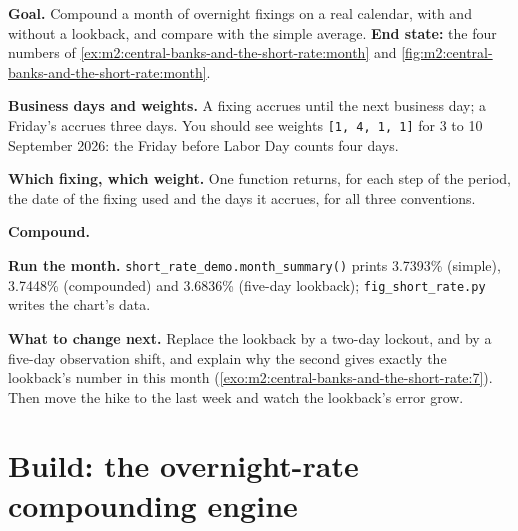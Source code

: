 \begin{tutorial}
\textbf{Goal.} Compound a month of overnight fixings on a real calendar,
with and without a lookback, and compare with the simple average.
\textbf{End state:} the four numbers of
\cref{ex:m2:central-banks-and-the-short-rate:month} and
\cref{fig:m2:central-banks-and-the-short-rate:month}.
\begin{tutsteps}
\item \textbf{Business days and weights.} A fixing accrues until the next
business day; a Friday's accrues three days.
\label{lst:m2:central-banks-and-the-short-rate:weights}
You should see weights \texttt{[1, 4, 1, 1]} for 3 to 10 September 2026: the
Friday before Labor Day counts four days.
\item \textbf{Which fixing, which weight.} One function returns, for each
step of the period, the date of the fixing used and the days it accrues, for
all three conventions.
\label{lst:m2:central-banks-and-the-short-rate:obs}
\item \textbf{Compound.}
\label{lst:m2:central-banks-and-the-short-rate:compound}
\item \textbf{Run the month.} \texttt{short\_rate\_demo.month\_summary()}
prints 3.7393\% (simple), 3.7448\% (compounded) and 3.6836\% (five-day
lookback); \texttt{fig\_short\_rate.py} writes the chart's data.
\end{tutsteps}
\textbf{What to change next.} Replace the lookback by a two-day lockout, and
by a five-day observation shift, and explain why the second gives exactly the
lookback's number in this month (\cref{exo:m2:central-banks-and-the-short-rate:7}).
Then move the hike to the last week and watch the lookback's error grow.
\end{tutorial}

\section{Build: the overnight-rate compounding engine}\label{bld:m2:central-banks-and-the-short-rate:rfr}

